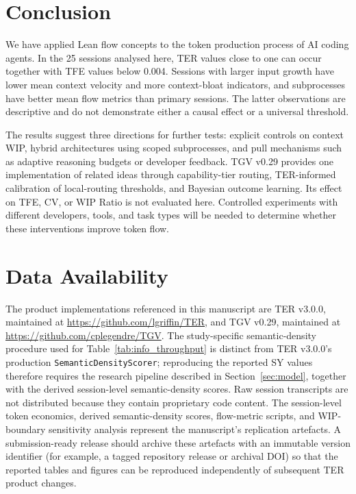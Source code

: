 \documentclass[journal]{IEEEtran}
\begin{document}
\section{Conclusion}
\label{sec:conclusion}

We have applied Lean flow concepts to the token production process of AI coding agents. In the 25 sessions analysed here, TER values close to one can occur together with TFE values below 0.004. Sessions with larger input growth have lower mean context velocity and more context-bloat indicators, and subprocesses have better mean flow metrics than primary sessions. The latter observations are descriptive and do not demonstrate either a causal effect or a universal threshold.

The results suggest three directions for further tests: explicit controls on context WIP, hybrid architectures using scoped subprocesses, and pull mechanisms such as adaptive reasoning budgets or developer feedback. TGV v0.29 provides one implementation of related ideas through capability-tier routing, TER-informed calibration of local-routing thresholds, and Bayesian outcome learning. Its effect on TFE, CV, or WIP Ratio is not evaluated here. Controlled experiments with different developers, tools, and task types will be needed to determine whether these interventions improve token flow.

\section*{Data Availability}

The product implementations referenced in this manuscript are TER v3.0.0, maintained at \url{https://github.com/lgriffin/TER}, and TGV v0.29, maintained at \url{https://github.com/cplegendre/TGV}. The study-specific semantic-density procedure used for Table~\ref{tab:info_throughput} is distinct from TER v3.0.0's production \texttt{SemanticDensityScorer}; reproducing the reported SY values therefore requires the research pipeline described in Section~\ref{sec:model}, together with the derived session-level semantic-density scores. Raw session transcripts are not distributed because they contain proprietary code content. The session-level token economics, derived semantic-density scores, flow-metric scripts, and WIP-boundary sensitivity analysis represent the manuscript's replication artefacts. A submission-ready release should archive these artefacts with an immutable version identifier (for example, a tagged repository release or archival DOI) so that the reported tables and figures can be reproduced independently of subsequent TER product changes.



\end{document}

